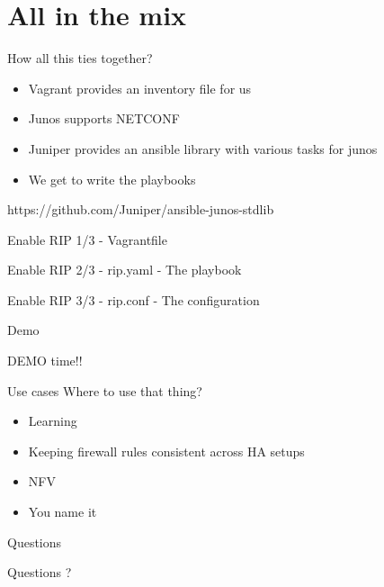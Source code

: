 \documentclass{beamer}
\begin{document}
\section{All in the mix}
    \begin{frame}{How all this ties together?}
        \begin{itemize}
            \pause \item Vagrant provides an inventory file for us
        \pause \item Junos supports NETCONF
        \pause \item Juniper provides an ansible library with various tasks for junos
        \pause \item We get to write the playbooks
        \end{itemize}
        \pause https://github.com/Juniper/ansible-junos-stdlib
    \end{frame}
    \begin{frame}{Enable RIP 1/3 - Vagrantfile}
        
    \end{frame}
    \begin{frame}{Enable RIP 2/3 - rip.yaml - The playbook}
        
    \end{frame}
    \begin{frame}{Enable RIP 3/3 - rip.conf - The configuration}
        
    \end{frame}
    \begin{frame}{Demo}
        \begin{center}
            \Huge DEMO time!!
        \end{center}
    \end{frame}
    \begin{frame}{Use cases}
        Where to use that thing?
        \begin{itemize}
            \pause \item Learning
            \pause \item Keeping firewall rules consistent across HA setups
            \pause \item NFV
            \pause \item You name it
        \end{itemize}
    \end{frame}
    \begin{frame}{Questions}
        \begin{center}
            \Huge Questions ?
        \end{center}
    \end{frame}
\end{document}
